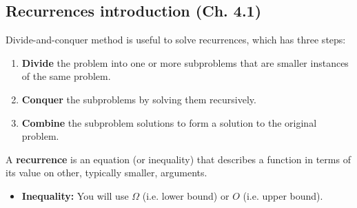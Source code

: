 \subsection{Recurrences introduction (Ch. 4.1)}
Divide-and-conquer method is useful to solve recurrences, which has three steps: 
\begin{enumerate}
    \item \textbf{Divide} the problem into one or more subproblems that are smaller instances of the same problem.
    \item \textbf{Conquer} the subproblems by solving them recursively.
    \item \textbf{Combine} the subproblem solutions to form a solution to the original problem.
\end{enumerate}

\begin{definition}
    A \textbf{recurrence} is an equation (or inequality) that describes a function in terms of its value on other, typically smaller, arguments.
    \begin{itemize}
        \item \textbf{Inequality:} You will use $\Omega$ (i.e. lower bound) or $O$ (i.e. upper bound).
    \end{itemize}
\end{definition}

